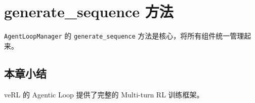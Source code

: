 \section{generate\_sequence 方法}
\texttt{AgentLoopManager} 的 \texttt{generate\_sequence} 方法是核心，将所有组件统一管理起来。

\subsection{本章小结}
veRL 的 Agentic Loop 提供了完整的 Multi-turn RL 训练框架。

